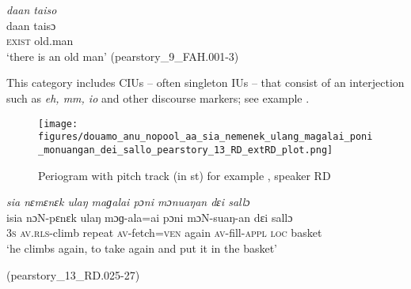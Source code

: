 {
	\ex
	\label{ex:daan taiso'}
	\textit{daan taiso{\ü}} \\
	\gll daan taisɔ{\ü} \\
	\textsc{exist} old.man\\
	\glt `there is an old man'
	\hfill(pearstory\_9\_FAH.001-3)
}
\z
\z




This  category includes CIUs -- often singleton IUs -- that  consist of an interjection such as  \textit{eh, mm, io} and other discourse markers; see example .


\begin{figure}
	\texttt{[image: figures/douamo\_anu\_nopool\_aa\_sia\_nemenek\_ulang\_magalai\_poni\_monuangan\_dei\_sallo\_pearstory\_13\_RD\_extRD\_plot.png]}
	\caption{Periogram with pitch track (in st) for example , speaker RD}
	\label{pitch:Rel with head2}
\end{figure}




\ea
\label{ex:Rel with head2}



{
	\ex
	\label{ex:sia nemenek ulang magalai poni monuangan dɛi sallo}
	\textit{sia nɛmɛnɛk ulaŋ maɡalai pɔni mɔnuaŋan dɛi sallɔ} \\
	\gll isia nɔN-pɛnɛk ulaŋ mɔɡ-ala=ai pɔni mɔN-suaŋ-an dɛi sallɔ \\
	3\textsc{s} \textsc{av.rls-}climb repeat \textsc{av-}fetch=\textsc{ven} again \textsc{av}-fill-\textsc{appl} \textsc{loc} basket\\
	\glt `he climbs again, to take again and put it in the basket'
	\begin{flushright}(pearstory\_13\_RD.025-27)
		\end{flushright}
}
\z
\z

